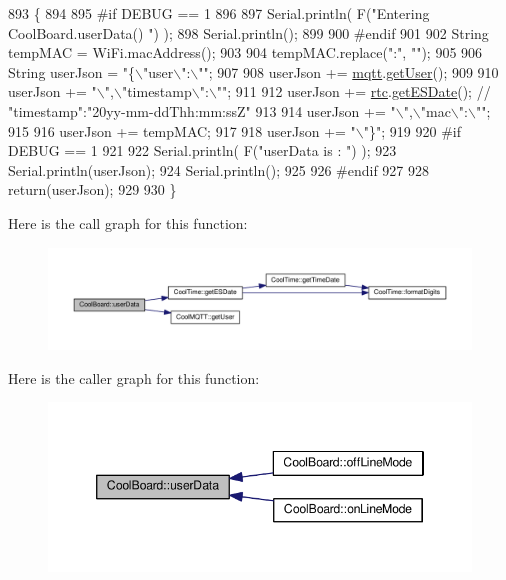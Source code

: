\begin{DoxyCode}
893 \{
894 
895 \textcolor{preprocessor}{#if DEBUG == 1}
896 
897     Serial.println( F(\textcolor{stringliteral}{"Entering CoolBoard.userData() "}) );
898     Serial.println();
899 
900 \textcolor{preprocessor}{#endif}
901 
902     String tempMAC = WiFi.macAddress();
903 
904     tempMAC.replace(\textcolor{stringliteral}{":"}, \textcolor{stringliteral}{""});
905 
906     String userJson = \textcolor{stringliteral}{"\{\(\backslash\)"user\(\backslash\)":\(\backslash\)""};
907 
908     userJson += \hyperlink{classCoolBoard_a2399f44d7c23c1149a335cb3b46d90f1}{mqtt}.\hyperlink{classCoolMQTT_a373cc92fca7760d886f02d8a6e5b3f63}{getUser}();
909 
910     userJson += \textcolor{stringliteral}{"\(\backslash\)",\(\backslash\)"timestamp\(\backslash\)":\(\backslash\)""};
911 
912     userJson += \hyperlink{classCoolBoard_a50d2a6716879d64a85f3c6b44ad63275}{rtc}.\hyperlink{classCoolTime_ac4f32ee513c1328d984306645e8785a4}{getESDate}(); \textcolor{comment}{// "timestamp":"20yy-mm-ddThh:mm:ssZ"}
913 
914     userJson += \textcolor{stringliteral}{"\(\backslash\)",\(\backslash\)"mac\(\backslash\)":\(\backslash\)""};
915 
916     userJson += tempMAC;
917 
918     userJson += \textcolor{stringliteral}{"\(\backslash\)"\}"};
919 
920 \textcolor{preprocessor}{#if DEBUG == 1}
921 
922     Serial.println( F(\textcolor{stringliteral}{"userData is : "}) );
923     Serial.println(userJson);
924     Serial.println();
925 
926 \textcolor{preprocessor}{#endif  }
927     
928     \textcolor{keywordflow}{return}(userJson);
929     
930 \}
\end{DoxyCode}
Here is the call graph for this function\+:\nopagebreak
\begin{figure}[H]
\begin{center}
\leavevmode
\includegraphics[width=350pt]{classCoolBoard_ae7358fb6e623cfc81b775f5f1734909b_cgraph}
\end{center}
\end{figure}
Here is the caller graph for this function\+:\nopagebreak
\begin{figure}[H]
\begin{center}
\leavevmode
\includegraphics[width=346pt]{classCoolBoard_ae7358fb6e623cfc81b775f5f1734909b_icgraph}
\end{center}
\end{figure}


